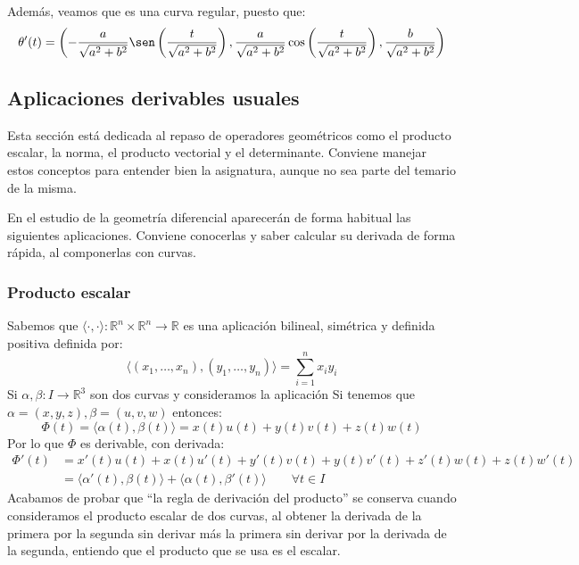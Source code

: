 \begin{ejemplo}
\begin{enumerate}
            Además, veamos que es una curva regular, puesto que:
            \begin{equation*}
                \theta'(t) = \left(-\frac{a}{\sqrt{a^2+b^2}}\sen\left(\frac{t}{\sqrt{a^2+b^2}}\right), \frac{a}{\sqrt{a^2+b^2}}\cos\left(\frac{t}{\sqrt{a^2+b^2}}\right),\frac{b}{\sqrt{a^2+b^2}}\right)
            \end{equation*}
    \end{enumerate}
\end{ejemplo}

\subsection{Aplicaciones derivables usuales}\label{sec:1.1.1.}
\noindent
Esta sección está dedicada al repaso de operadores geométricos como el producto escalar, la norma, el producto vectorial y el determinante. Conviene manejar estos conceptos para entender bien la asignatura, aunque no sea parte del temario de la misma.

\noindent
En el estudio de la geometría diferencial aparecerán de forma habitual las siguientes aplicaciones. Conviene conocerlas y saber calcular su derivada de forma rápida, al componerlas con curvas.

\subsubsection{Producto escalar}
\noindent
Sabemos que $\langle \cdot ,\cdot  \rangle:\mathbb{R}^n\times\mathbb{R}^n\to\mathbb{R} $ es una aplicación bilineal, simétrica y definida positiva definida por:
\begin{equation*}
    \langle (x_1,\ldots,x_n),(y_1,\ldots,y_n) \rangle = \sum_{i=1}^{n}x_iy_i
\end{equation*}
Si $\alpha,\beta:I\to\mathbb{R}^3$ son dos curvas y consideramos la aplicación 
Si tenemos que $\alpha=(x,y,z), \beta = (u,v,w)$ entonces:
\begin{equation*}
    \Phi(t) = \langle \alpha(t),\beta(t) \rangle = x(t)u(t) + y(t)v(t) + z(t)w(t)
\end{equation*}
Por lo que $\Phi$ es derivable, con derivada:
\begin{align*}
    \Phi'(t) &= x'(t)u(t) + x(t)u'(t) + y'(t)v(t) + y(t)v'(t) + z'(t)w(t) + z(t)w'(t) \\
             &= \langle \alpha'(t),\beta(t) \rangle + \langle \alpha(t),\beta'(t) \rangle  \qquad \forall t\in I
\end{align*}
Acabamos de probar que ``la regla de derivación del producto'' se conserva cuando consideramos el producto escalar de dos curvas, al obtener la derivada de la primera por la segunda sin derivar más la primera sin derivar por la derivada de la segunda, entiendo que el producto que se usa es el escalar.\\


